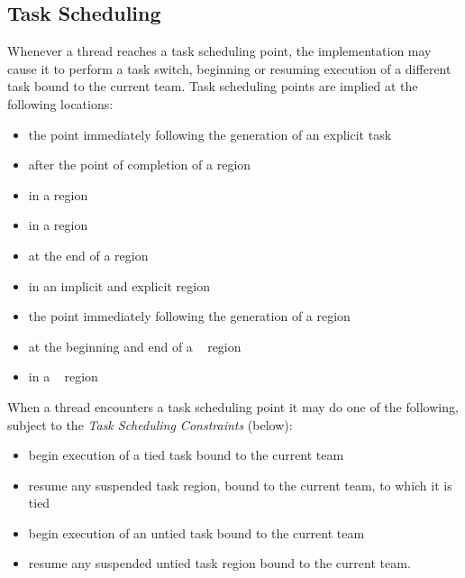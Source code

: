 \subsection{Task Scheduling}
\label{subsec:Task Scheduling}
Whenever a thread reaches a task scheduling point, the implementation may cause it to 
perform a task switch, beginning or resuming execution of a different task bound to the 
current team. Task scheduling points are implied at the following locations:

\begin{itemize}
\item the point immediately following the generation of an explicit task

\item after the point of completion of a  region

\item in a  region

\item in a  region

\item at the end of a  region

\item in an implicit and explicit  region

\item the point immediately following the generation of a  region

\item at the beginning and end of a ~ region

\item in a ~ region 
\end{itemize}

When a thread encounters a task scheduling point it may do one of the following, 
subject to the \emph{Task Scheduling Constraints} (below):

\begin{itemize}
\item begin execution of a tied task bound to the current team

\item resume any suspended task region, bound to the current team, to which it is tied

\item begin execution of an untied task bound to the current team

\item resume any suspended untied task region bound to the current team.
\end{itemize}


